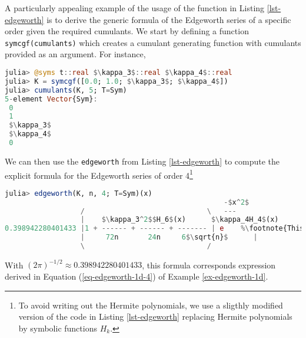 A particularly appealing example of the usage of the function in Listing \ref{lst-edgeworth} is to derive the generic formula of the Edgeworth series of a specific order given the required cumulants. We start by defining a function \lstinline{symcgf(cumulants)} which creates a cumulant generating function with cumulants provided as an argument. For instance,
\begin{lstlisting}[language=Julia, mathescape, escapechar=\%]
julia> @syms t::real $\kappa_3$::real $\kappa_4$::real
julia> K = symcgf([0.0; 1.0; $\kappa_3$; $\kappa_4$])
julia> cumulants(K, 5; T=Sym)
5-element Vector{Sym}:
 0
 1
 $\kappa_3$
 $\kappa_4$
 0
\end{lstlisting}
We can then use the \lstinline{edgeworth} from Listing \ref{lst-edgeworth} to compute the explicit formula for the Edgeworth series of order 4\footnote{To avoid writing out the Hermite polynomials, we use a sligthly modified version of the code in Listing \ref{lst-edgeworth} replacing Hermite polynomials by symbolic functions $H_k$.}
\newpage
\begin{lstlisting}[language=Julia, mathescape, escapechar=\%]
julia> edgeworth(K, n, 4; T=Sym)(x)
                                                    -$x^2$  
                  /                             \   ---
                  |    $\kappa_3^2$$H_6$(x)      $\kappa_4H_4$(x)      $\kappa_3H_3$(x)     |   2  
0.398942280401433 |1 + ------ + ------ + ------- | e    %\footnote{This output was lightly adapted to properly render in LaTeX. }%
                  |     72n       24n     6$\sqrt{n}$      |      
                  \                             /    

\end{lstlisting}
With $(2\pi)^{-1/2} \approx 0.398942280401433$, this formula corresponds expression derived in Equation (\ref{eq-edgeworth-1d-4}) of Example \ref{ex-edgeworth-1d}.

